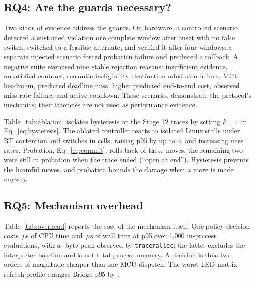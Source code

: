 \documentclass[conference]{IEEEtran}
\begin{document}
\subsection{RQ4: Are the guards necessary?}
\label{sec:guards}
Two kinds of evidence address the guards. On hardware, a controlled scenario
detected a sustained violation one complete window after onset with no false
switch, switched to a feasible alternate, and verified it after four windows;
a separate injected scenario forced probation failure and produced a
rollback. A negative suite exercised nine stable rejection reasons:
insufficient evidence, unsatisfied contract, semantic ineligibility,
destination admission failure, MCU headroom, predicted deadline miss, higher
predicted end-to-end cost, observed miss-rate failure, and active cooldown.
These scenarios demonstrate the protocol's mechanics; their latencies are
not used as performance evidence.

Table~\ref{tab:ablation} isolates hysteresis on the Stage 12 traces by
setting $k=1$ in Eq.~\eqref{eq:hysteresis}. The ablated controller reacts to
isolated Linux stalls under RT contention and switches in
\StageTwelveAblatedSwitches{} cells, raising p95 by up to
\StageTwelveAblationWorstRatio$\times$ and increasing miss rates. Probation,
Eq.~\eqref{eq:commit}, rolls back \StageTwelveAblatedRollbacks{} of these
moves; the remaining two were still in probation when the trace ended (``open at end'').
Hysteresis prevents the harmful moves, and probation bounds the damage when
a move is made anyway.

\begin{table}[t]
\caption{Hysteresis ablation under RT contention: switching on the first
violating window ($k=1$) instead of $k=3$.}
\label{tab:ablation}
\centering
\scriptsize
\setlength{\tabcolsep}{3pt}

\end{table}

\subsection{RQ5: Mechanism overhead}
Table~\ref{tab:overhead} reports the cost of the mechanism itself. One policy
decision costs \PolicyCpuP\,$\mu$s of CPU time and \PolicyWallP\,$\mu$s of wall
time at p95 over 1,000 in-process evaluations, with a \PolicyPeakBytes-byte
peak observed by \texttt{tracemalloc}; the latter excludes the interpreter
baseline and is not total process memory. A decision is thus two orders of
magnitude cheaper than one MCU dispatch. The worst LED-matrix refresh profile
changes Bridge p95 by \VisualizationOverhead.
\end{document}
